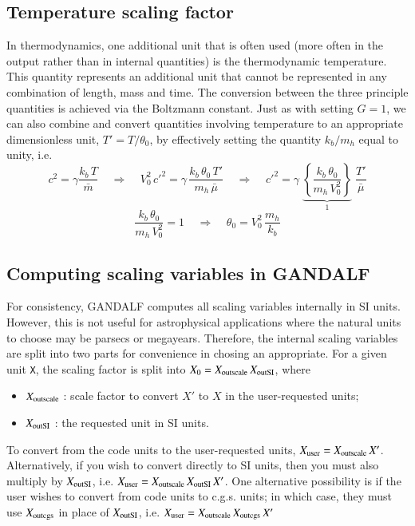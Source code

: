 \documentclass[a4paper]{article}
\newcommand{\var}[1]{\texttt{#1}}
\begin{document}
\subsection{Temperature scaling factor}
In thermodynamics, one additional unit that is often used (more often in the output rather than in internal quantities) is the thermodynamic temperature.  This quantity represents an additional unit that cannot be represented in any combination of length, mass and time.  The conversion between the three principle quantities is achieved via the Boltzmann constant.  Just as with setting $G = 1$, we can also combine and convert quantities involving temperature to an appropriate dimensionless unit, $T' = T/\theta_0$, by effectively setting the quantity $k_b/m_h$ equal to unity, i.e.
\begin{equation}
c^2 = \gamma \frac{k_b\,T}{\bar{m}} \;\;\;\; \Rightarrow \;\;\;\;
V_0^2\,{c'}^2 = \gamma\,\frac{k_b\,\theta_0\,T'}{m_h\,\bar{\mu}}
\;\;\;\; \Rightarrow \;\;\;\;
{c'}^2 = \gamma \; \underbrace{ \left\{ \frac{k_b\,\theta_0}{m_h\, V_0^2} \right\} }_{1} \; \frac{T'}{\bar{\mu}}
\end{equation}
\begin{equation}
\frac{k_b\,\theta_0}{m_h\, V_0^2} = 1 \;\;\;\; \Rightarrow \;\;\;\; \theta_0 = V_0^2\,\frac{m_h}{k_b}
\end{equation}




\subsection{Computing scaling variables in GANDALF}
For consistency, GANDALF computes all scaling variables internally in SI units.  However, this is not useful for astrophysical applications where the natural units to choose may be parsecs or megayears.  Therefore, the internal scaling variables are split into two parts for convenience in chosing an appropriate.  For a given unit \var{X}, the scaling factor is split into $X_0 = X_{\rm outscale} \, X_{\rm outSI}$, where
\begin{itemize}
\item $X_{\rm outscale}$ : scale factor to convert $X'$ to $X$ in the user-requested units;
\item $X_{\rm outSI}$ : the requested unit in SI units.
\end{itemize}
To convert from the code units to the user-requested units, $X_{\rm user} = X_{\rm outscale}\,X'$.  Alternatively, if you wish to convert directly to SI units, then you must also multiply by $X_{\rm outSI}$, i.e. $X_{\rm user} = X_{\rm outscale}\,X_{\rm outSI}\,X'$.  One alternative possibility is if the user wishes to convert from code units to c.g.s. units; in which case, they must use $X_{\rm outcgs}$ in place of $X_{\rm outSI}$, i.e. $X_{\rm user} = X_{\rm outscale}\,X_{\rm outcgs}\,X'$
\end{document}
